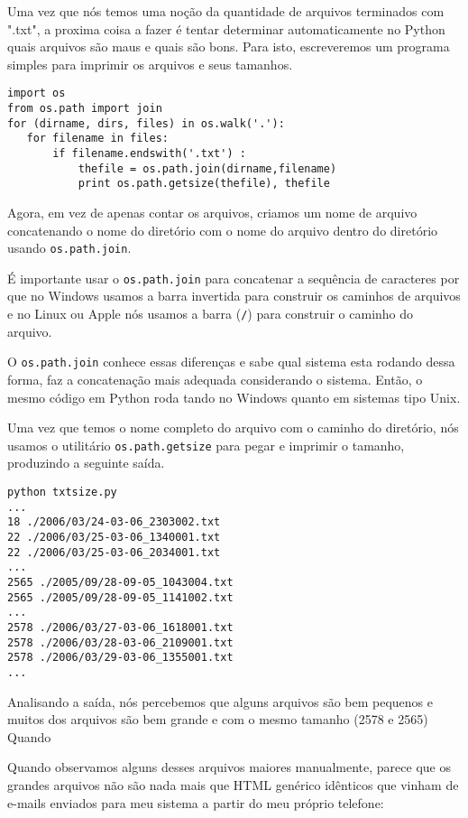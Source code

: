 Uma vez que nós temos uma noção da quantidade de arquivos terminados com ".txt", a proxima coisa a fazer é tentar determinar  automaticamente no Python quais arquivos são maus e quais são bons. Para isto, escreveremos um programa simples para imprimir os arquivos e seus tamanhos.

\begin{verbatim}
import os
from os.path import join
for (dirname, dirs, files) in os.walk('.'):
   for filename in files:
       if filename.endswith('.txt') :
           thefile = os.path.join(dirname,filename)
           print os.path.getsize(thefile), thefile
\end{verbatim}
%

Agora, em vez de apenas contar os arquivos, criamos um nome de arquivo concatenando o nome do diretório com
o nome do arquivo dentro do diretório usando {\tt os.path.join}.

É importante usar o {\tt os.path.join} para concatenar a sequência de caracteres por que no Windows usamos a
barra invertida para construir os caminhos de arquivos e no Linux ou Apple nós usamos a barra (\verb"/") para construir o 
caminho do arquivo.

O {\tt os.path.join} conhece essas diferenças e sabe qual sistema esta rodando dessa forma, faz a concatenação mais adequada considerando o sistema. Então, o mesmo código em Python roda tando no Windows quanto em sistemas tipo Unix.

Uma vez que temos o nome completo do arquivo com o caminho do diretório, nós usamos o utilitário {\tt os.path.getsize} para pegar
e imprimir o tamanho, produzindo a seguinte saída.  

\begin{verbatim}
python txtsize.py
...
18 ./2006/03/24-03-06_2303002.txt
22 ./2006/03/25-03-06_1340001.txt
22 ./2006/03/25-03-06_2034001.txt
...
2565 ./2005/09/28-09-05_1043004.txt
2565 ./2005/09/28-09-05_1141002.txt
...
2578 ./2006/03/27-03-06_1618001.txt
2578 ./2006/03/28-03-06_2109001.txt
2578 ./2006/03/29-03-06_1355001.txt
...
\end{verbatim}

Analisando a saída, nós percebemos que alguns arquivos são bem pequenos e muitos dos arquivos são bem grande e com o mesmo tamanho (2578 e 2565)
Quando 

%

Quando observamos alguns desses arquivos maiores manualmente, parece que os grandes arquivos não são nada mais que HTML genérico idênticos que vinham de e-mails enviados para meu sistema a partir do meu próprio telefone:

